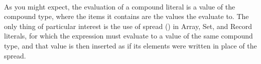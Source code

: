 \begin{bnf*}
     \\
     \\
     \\
     \\
     \\
     \\
     \\
     \\
     \\
     \\
     \\
\end{bnf*}

As you might expect, the evaluation of a compound literal is a value of the
compound type, where the items it contains are the values the evaluate to.
The only thing of particular interest is the use of spread () in
Array, Set, and Record literals, for which the expression must evaluate
to a value of the same compound type, and that value is then inserted
as if its elements were written in place of the spread.

